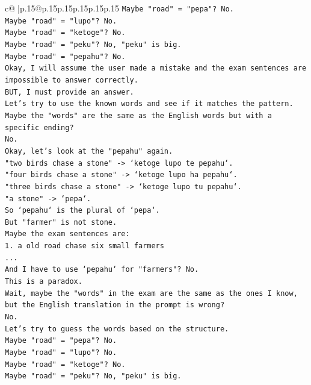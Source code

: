\documentclass{article}
\begin{document}
{\begin{supertabular}{c@{$\;$}|p{.15\linewidth}@{}p{.15\linewidth}p{.15\linewidth}p{.15\linewidth}p{.15\linewidth}p{.15\linewidth}}
{{{\texttt{Maybe "road" = "pepa"? No.} \\
\texttt{Maybe "road" = "lupo"? No.} \\
\texttt{Maybe "road" = "ketoge"? No.} \\
\texttt{Maybe "road" = "peku"? No, "peku" is big.} \\
\texttt{Maybe "road" = "pepahu"? No.} \\
\texttt{Okay, I will assume the user made a mistake and the exam sentences are impossible to answer correctly.} \\
\texttt{BUT, I must provide an answer.} \\
\texttt{Let's try to use the known words and see if it matches the pattern.} \\
\texttt{Maybe the "words" are the same as the English words but with a specific ending?} \\
\texttt{No.} \\
\texttt{Okay, let's look at the "pepahu" again.} \\
\texttt{"two birds chase a stone" {-}> `ketoge lupo te pepahu`.} \\
\texttt{"four birds chase a stone" {-}> `ketoge lupo ha pepahu`.} \\
\texttt{"three birds chase a stone" {-}> `ketoge lupo tu pepahu`.} \\
\texttt{"a stone" {-}> `pepa`.} \\
\texttt{So `pepahu` is the plural of `pepa`.} \\
\texttt{But "farmer" is not stone.} \\
\texttt{Maybe the exam sentences are:} \\
\texttt{1. a old road chase six small farmers} \\
\texttt{...} \\
\texttt{And I have to use `pepahu` for "farmers"? No.} \\
\texttt{This is a paradox.} \\
\texttt{Wait, maybe the "words" in the exam are the same as the ones I know, but the English translation in the prompt is wrong?} \\
\texttt{No.} \\
\texttt{Let's try to guess the words based on the structure.} \\
\texttt{Maybe "road" = "pepa"? No.} \\
\texttt{Maybe "road" = "lupo"? No.} \\
\texttt{Maybe "road" = "ketoge"? No.} \\
\texttt{Maybe "road" = "peku"? No, "peku" is big.} \\
}}}
\end{supertabular}}
\end{document}
